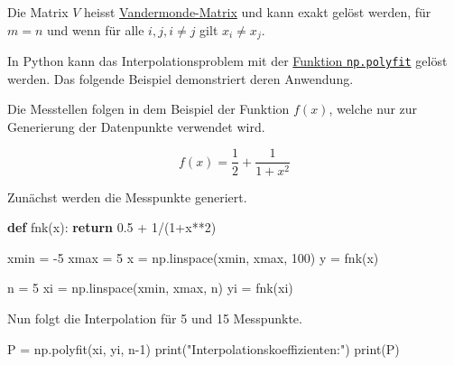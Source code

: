 \documentclass[
  letterpaper,
  DIV=11,
  numbers=noendperiod]{scrreprt}
\newenvironment{Shaded}{\begin{snugshade}}{\end{snugshade}}
\newcommand{\BuiltInTok}[1]{\textcolor[rgb]{0.00,0.23,0.31}{#1}}
\newcommand{\ControlFlowTok}[1]{\textcolor[rgb]{0.00,0.23,0.31}{\textbf{#1}}}
\newcommand{\DecValTok}[1]{\textcolor[rgb]{0.68,0.00,0.00}{#1}}
\newcommand{\FloatTok}[1]{\textcolor[rgb]{0.68,0.00,0.00}{#1}}
\newcommand{\KeywordTok}[1]{\textcolor[rgb]{0.00,0.23,0.31}{\textbf{#1}}}
\newcommand{\NormalTok}[1]{\textcolor[rgb]{0.00,0.23,0.31}{#1}}
\newcommand{\OperatorTok}[1]{\textcolor[rgb]{0.37,0.37,0.37}{#1}}
\newcommand{\StringTok}[1]{\textcolor[rgb]{0.13,0.47,0.30}{#1}}
\begin{document}
Die Matrix \(V\) heisst
\href{https://de.wikipedia.org/wiki/Vandermonde-Matrix}{Vandermonde-Matrix}
und kann exakt gelöst werden, für \(m=n\) und wenn für alle
\(i, j, i\neq j\) gilt \(x_i \neq x_j\).

In Python kann das Interpolationsproblem mit der
\href{https://numpy.org/doc/stable/reference/generated/numpy.polyfit.html}{Funktion
\texttt{np.polyfit}} gelöst werden. Das folgende Beispiel demonstriert
deren Anwendung.

Die Messtellen folgen in dem Beispiel der Funktion \(f(x)\), welche nur
zur Generierung der Datenpunkte verwendet wird.

\[ f(x) = \frac{1}{2} + \frac{1}{1+x^2}\]

Zunächst werden die Messpunkte generiert.

\begin{Shaded}
\begin{Highlighting}[]
\KeywordTok{def}\NormalTok{ fnk(x):}
    \ControlFlowTok{return} \FloatTok{0.5} \OperatorTok{+} \DecValTok{1}\OperatorTok{/}\NormalTok{(}\DecValTok{1}\OperatorTok{+}\NormalTok{x}\OperatorTok{**}\DecValTok{2}\NormalTok{)}
\end{Highlighting}
\end{Shaded}

\begin{Shaded}
\begin{Highlighting}[]
\NormalTok{xmin }\OperatorTok{=} \OperatorTok{{-}}\DecValTok{5}
\NormalTok{xmax }\OperatorTok{=}  \DecValTok{5}
\NormalTok{x }\OperatorTok{=}\NormalTok{ np.linspace(xmin, xmax, }\DecValTok{100}\NormalTok{)}
\NormalTok{y }\OperatorTok{=}\NormalTok{ fnk(x)}
\end{Highlighting}
\end{Shaded}

\begin{Shaded}
\begin{Highlighting}[]
\NormalTok{n }\OperatorTok{=} \DecValTok{5}
\NormalTok{xi }\OperatorTok{=}\NormalTok{ np.linspace(xmin, xmax, n)}
\NormalTok{yi }\OperatorTok{=}\NormalTok{ fnk(xi)}
\end{Highlighting}
\end{Shaded}

Nun folgt die Interpolation für 5 und 15 Messpunkte.

\begin{Shaded}
\begin{Highlighting}[]
\NormalTok{P }\OperatorTok{=}\NormalTok{ np.polyfit(xi, yi, n}\OperatorTok{{-}}\DecValTok{1}\NormalTok{)}
\BuiltInTok{print}\NormalTok{(}\StringTok{"Interpolationskoeffizienten:"}\NormalTok{)}
\BuiltInTok{print}\NormalTok{(P)}
\end{Highlighting}
\end{Shaded}
\end{document}

